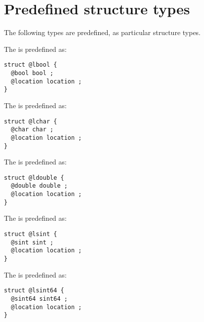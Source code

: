 
\chapter{Predefined structure types}

The following types are predefined, as particular structure types.


The  is predefined as:
\begin{lstlisting}[language=galgas]
struct @lbool {
  @bool bool ;
  @location location ;
}
\end{lstlisting}





The  is predefined as:
\begin{lstlisting}[language=galgas]
struct @lchar {
  @char char ;
  @location location ;
}
\end{lstlisting}








The  is predefined as:
\begin{lstlisting}[language=galgas]
struct @ldouble {
  @double double ;
  @location location ;
}
\end{lstlisting}








The  is predefined as:
\begin{lstlisting}[language=galgas]
struct @lsint {
  @sint sint ;
  @location location ;
}
\end{lstlisting}









The  is predefined as:
\begin{lstlisting}[language=galgas]
struct @lsint64 {
  @sint64 sint64 ;
  @location location ;
}
\end{lstlisting}







